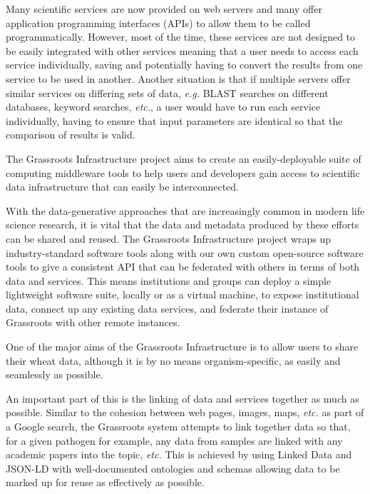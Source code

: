 \documentclass[9pt,a4paper]{extarticle}
\begin{document}
Many scientific services are now provided on web servers and many offer application programming interfaces (APIs) to allow them to be called programmatically. 
However, most of the time, these services are not designed to be easily integrated with other services meaning that a user needs to access each service individually, saving and potentially having to convert the results from one service to be used in another. 
Another situation is that if multiple servers offer similar services on differing sets of data, \textit{e.g.} BLAST searches on different databases, keyword searches, \textit{etc.}, a user would have to run each service individually, having to ensure that input parameters are identical so that the comparison of results is valid. 

The Grassroots Infrastructure project aims to create an easily-deployable suite of computing middleware tools to help users and developers gain access to scientific data infrastructure that can easily be interconnected.

With the data-generative approaches that are increasingly common in modern life science research, it is vital that the data and metadata produced by these efforts can be shared and reused. 
The Grassroots Infrastructure project wraps up industry-standard software tools along with our own custom open-source software tools to give a consistent API that can be federated with others in terms of both data and services. 
This means institutions and groups can deploy a simple lightweight software suite, locally or as a virtual machine, to expose institutional data, connect up any existing data services, and federate their instance of Grassroots with other remote instances.

One of the major aims of the Grassroots Infrastructure is to allow users to share their wheat data, although it is by no means organism-specific, as easily and seamlessly as possible. 

An important part of this is the linking of data and services together as much as possible. Similar to the cohesion between web pages, images, maps, \textit{etc.} as part of a Google search, the Grassroots system attempts to link together data so that, for a given pathogen for example, any data from samples are linked with any academic papers into the topic, \textit{etc.}
This is achieved by using Linked Data and JSON-LD with well-documented ontologies and schemas allowing data to be marked up for reuse as effectively as possible.

\end{document}
